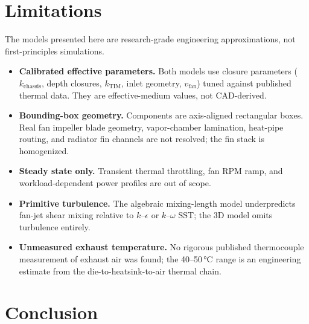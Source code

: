 \documentclass[10pt,twocolumn,letterpaper]{article}
\newcommand{\kTIM}{k_{\mathrm{TIM}}}
\newcommand{\vfan}{v_{\mathrm{fan}}}
\begin{document}
\section{Limitations}
\label{sec:limits}

The models presented here are research-grade engineering
approximations, not first-principles simulations.

\begin{itemize}
  \item \textbf{Calibrated effective parameters.} Both models use
    closure parameters ($k_{\mathrm{chassis}}$, depth closures,
    $\kTIM$, inlet geometry, $\vfan$) tuned against published
    thermal data. They are effective-medium values, not CAD-derived.

  \item \textbf{Bounding-box geometry.} Components are
    axis-aligned rectangular boxes. Real fan impeller blade
    geometry, vapor-chamber lamination, heat-pipe routing, and
    radiator fin channels are not resolved; the fin stack is
    homogenized.

  \item \textbf{Steady state only.} Transient thermal throttling,
    fan RPM ramp, and workload-dependent power profiles are out
    of scope.

  \item \textbf{Primitive turbulence.} The algebraic mixing-length
    model underpredicts fan-jet shear mixing relative to
    $k$--$\epsilon$ or $k$--$\omega$ SST; the 3D model omits
    turbulence entirely.

  \item \textbf{Unmeasured exhaust temperature.} No rigorous
    published thermocouple measurement of exhaust air was found;
    the 40--50\,\si{\celsius} range is an engineering estimate from
    the die-to-heatsink-to-air thermal chain.
\end{itemize}

\section{Conclusion}
\label{sec:conclusion}
\end{document}
